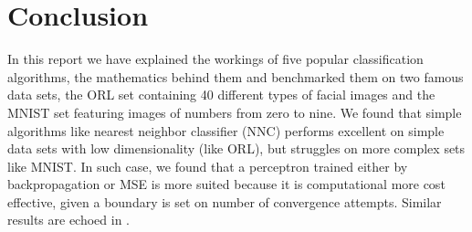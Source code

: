 \documentclass[journal]{IEEEtran}
\begin{document}
\section{Conclusion}

In this report we have explained the workings of five popular classification algorithms, the mathematics behind them and benchmarked them on two famous data sets, the ORL set containing 40 different types of facial images and the MNIST set featuring images of numbers from zero to nine. We found that simple algorithms like nearest neighbor classifier (NNC) performs excellent on simple data sets with low dimensionality (like ORL), but struggles on more complex sets like MNIST. In such case, we found that a perceptron trained either by backpropagation or MSE is more suited because it is computational more cost effective, given a boundary is set on number of convergence attempts. Similar results are echoed in \cite{Roy2005}.















 
\end{document}
